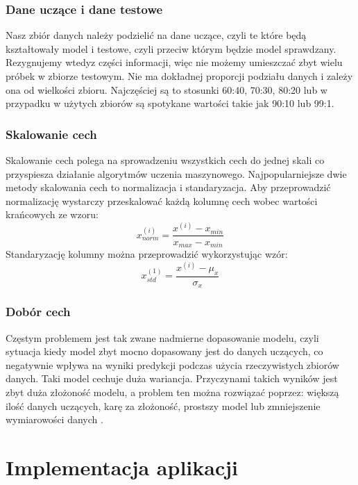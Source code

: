 \documentclass[printmode, eng]{mgr}
\newcommand\tab[1][1cm]{\hspace*{#1}}
\begin{document}
\subsection{Dane uczące i dane testowe}
\tab Nasz zbiór danych należy podzielić na dane uczące, czyli te które będą kształtowały model i testowe, czyli przeciw którym będzie model sprawdzany. Rezygnujemy wtedy\linebreak z części informacji, więc nie możemy umieszczać zbyt wielu próbek w zbiorze testowym. Nie ma dokładnej proporcji podziału danych i zależy ona od wielkości zbioru. Najczęściej są to stosunki 60:40, 70:30, 80:20 lub w przypadku w użytych zbiorów są spotykane wartości takie jak 90:10 lub 99:1.
\subsection{Skalowanie cech}
\tab Skalowanie cech polega na sprowadzeniu wszystkich cech do jednej skali co przyspiesza działanie algorytmów uczenia maszynowego. Najpopularniejsze dwie metody skalowania cech to normalizacja i standaryzacja. Aby przeprowadzić normalizację wystarczy przeskalować każdą kolumnę cech wobec wartości krańcowych ze wzoru:\\
\begin{equation}
x^{(i)}_{norm} = \dfrac{x^{(i)}-x_{min}}{x_{max}-x_{min}}
\end{equation}
Standaryzację kolumny można przeprowadzić wykorzystując wzór:\\
\begin{equation}
x^{(1)}_{std} = \dfrac{x^{(i)} - \mu_x}{\sigma_x}
\end{equation}
\subsection{Dobór cech}
\tab Częstym problemem jest tak zwane nadmierne dopasowanie modelu, czyli sytuacja kiedy model zbyt mocno dopasowany jest do danych uczących, co negatywnie wpływa na wyniki predykcji podczas użycia rzeczywistych zbiorów danych. Taki model cechuje duża wariancja. Przyczynami takich wyników jest zbyt duża złożoność modelu, a problem ten można rozwiązać poprzez: większą ilość danych uczących, karę za złożoność, prostszy model lub zmniejszenie wymiarowości danych \cite{rash}. 
\chapter{Implementacja aplikacji}
\end{document}
